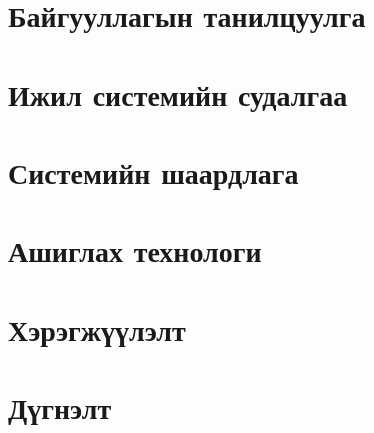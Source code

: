 
\chapter{Байгууллагын танилцуулга}


\chapter{Ижил системийн судалгаа}


\chapter{Системийн шаардлага}


\chapter{Ашиглах технологи}


% 

\chapter{Хэрэгжүүлэлт}


\chapter{Дүгнэлт}
